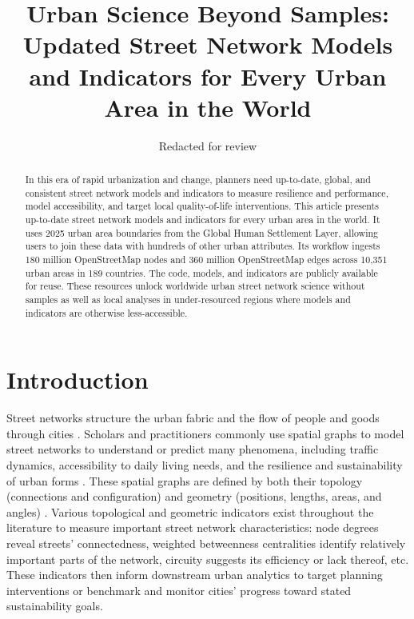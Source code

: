 \documentclass[12pt,letterpaper]{article} %
\makeatletter
\newcommand{\myname}{Geoff Boeing}
\newcommand{\myemail}{boeing@usc.edu}
\newcommand{\myaffiliation}{Department of Urban Planning and Spatial Analysis\\University of Southern California}
\newcommand{\paperdate}{April 2025}
\newcommand{\papertitle}{Urban Science Beyond Samples: Updated Street Network Models and Indicators for Every Urban Area in the World}
\newcommand{\papercitation}{Boeing, G. 2025. \papertitle. Under review at \textit{Journal Name}.}
\makeatother
\begin{document}
\title{\papertitle}%
\author[]{Redacted for review}%
\date{}%

\maketitle

\begin{abstract}

In this era of rapid urbanization and change, planners need up-to-date, global, and consistent street network models and indicators to measure resilience and performance, model accessibility, and target local quality-of-life interventions. This article presents up-to-date street network models and indicators for every urban area in the world. It uses 2025 urban area boundaries from the Global Human Settlement Layer, allowing users to join these data with hundreds of other urban attributes. Its workflow ingests 180 million OpenStreetMap nodes and 360 million OpenStreetMap edges across 10,351 urban areas in 189 countries. The code, models, and indicators are publicly available for reuse. These resources unlock worldwide urban street network science without samples as well as local analyses in under-resourced regions where models and indicators are otherwise less-accessible.

\end{abstract}


\section{Introduction}

Street networks structure the urban fabric and the flow of people and goods through cities \citep{barrington-leigh_global_2020}. Scholars and practitioners commonly use spatial graphs to model street networks to understand or predict many phenomena, including traffic dynamics, accessibility to daily living needs, and the resilience and sustainability of urban forms \citep{barthelemy_spatial_2022}. These spatial graphs are defined by both their topology (connections and configuration) and geometry (positions, lengths, areas, and angles) \citep{fischer_spatial_2014}. Various topological and geometric indicators exist throughout the literature to measure important street network characteristics: node degrees reveal streets' connectedness, weighted betweenness centralities identify relatively important parts of the network, circuity suggests its efficiency or lack thereof, etc. These indicators then inform downstream urban analytics to target planning interventions or benchmark and monitor cities' progress toward stated sustainability goals.
\end{document}
